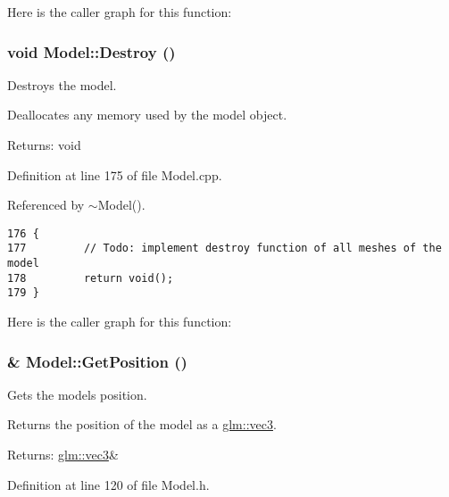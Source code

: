 Here is the caller graph for this function:\hypertarget{class_model_d60ed0ed7eaa7dcdd58398e6efacc7c4}{
\subsubsection[Destroy]{\setlength{\rightskip}{0pt plus 5cm}void Model::Destroy ()}}
\label{class_model_d60ed0ed7eaa7dcdd58398e6efacc7c4}


Destroys the model. 

Deallocates any memory used by the model object.

\begin{Desc}
\item[Returns:]void \end{Desc}


Definition at line 175 of file Model.cpp.

Referenced by $\sim$Model().

\begin{Code}\begin{verbatim}176 {
177         // Todo: implement destroy function of all meshes of the model
178         return void();
179 }
\end{verbatim}
\end{Code}




Here is the caller graph for this function:\hypertarget{class_model_f4b5a0bae6b0b057c118444189c5dfa9}{
\subsubsection[GetPosition]{\& Model::GetPosition ()}}
\label{class_model_f4b5a0bae6b0b057c118444189c5dfa9}


Gets the models position. 

Returns the position of the model as a \hyperlink{group__core__types_g1c47e8b3386109bc992b6c48e91b0be7}{glm::vec3}.

\begin{Desc}
\item[Returns:]\hyperlink{group__core__types_g1c47e8b3386109bc992b6c48e91b0be7}{glm::vec3}\& \end{Desc}


Definition at line 120 of file Model.h.

